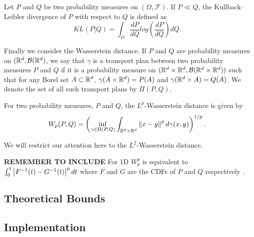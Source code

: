 \begin{defn}
Let $P$ and $Q$ be two probability measures on $(\Omega, \mathcal{F})$.  If $P \ll Q$, the Kullback--Leibler divergence of $P$ with respect to $Q$ is defined as
$$
KL(P|Q) = \int_\Omega \frac{d P}{d Q} log \left(  \frac{d P}{d Q} \right) d Q.
$$
\end{defn}
Finally we consider the Wasserstein distance.  If $P$ and $Q$ are probability measures on $(\mathbb{R}^d,\mathcal{B}(\mathbb{R}^d)$, we say that $\gamma$ is a transport plan between two probability measures $P$ and $Q$ if it is a probability measure on $(\mathbb{R}^d \times \mathbb{R}^d, \mathcal{B}(\mathbb{R}^d \times \mathbb{R}^d))$ such that for any Borel set $A \subset \mathbb{R}^d$, $\gamma(A \times \mathbb{R}^d)=P(A)$ and $\gamma(\mathbb{R}^d \times A) = Q(A)$.  We denote the set of all such transport plans by $\Pi(P,Q)$.
\begin{defn}
For two probability measures, $P$ and $Q$, the $L^p$-Wasserstein distance is given by
$$
W_p(P,Q) = \left( \inf_{\gamma \in \Pi(P,Q)} \int_{\R^d \times \R^d} \norm{x-y}^p d \gamma(x,y) \right)^{1/p}.
$$
\end{defn}
We will restrict our attention here to the $L^2$-Wasserstein distance.

\textbf{REMEMBER TO INCLUDE} For 1D $W_p^p$ is equivalent to $\int_0^1 \abs{F^{-1}(t)-G^{-1}(t)}^p dt$ where $F$ and $G$ are the CDFs of $P$ and $Q$ respectively \cite{ramdas2017wasserstein}.

\subsection{Theoretical Bounds}
\subsection{Implementation}
